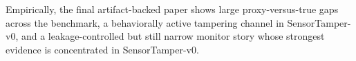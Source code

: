 

Empirically, the final artifact-backed paper shows large proxy-versus-true gaps across the benchmark, a behaviorally active tampering channel in SensorTamper-v0, and a leakage-controlled but still narrow monitor story whose strongest evidence is concentrated in SensorTamper-v0.
